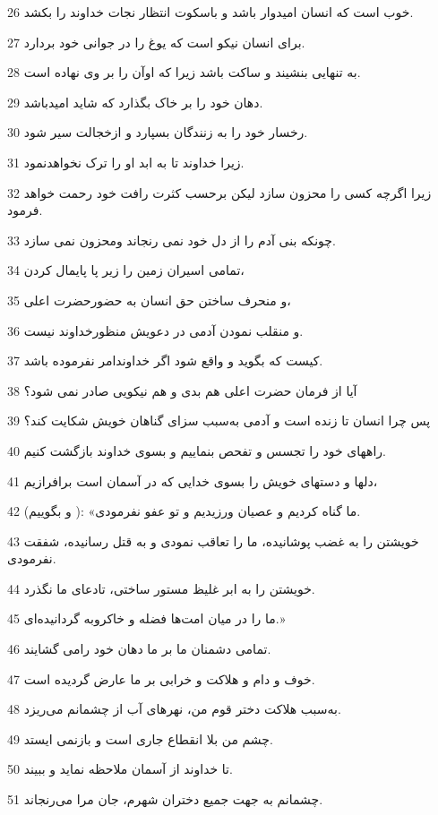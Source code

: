 \par 26 خوب است که انسان امیدوار باشد و باسکوت انتظار نجات خداوند را بکشد.
\par 27 برای انسان نیکو است که یوغ را در جوانی خود بردارد.
\par 28 به تنهایی بنشیند و ساکت باشد زیرا که اوآن را بر وی نهاده است.
\par 29 دهان خود را بر خاک بگذارد که شاید امیدباشد.
\par 30 رخسار خود را به زنندگان بسپارد و ازخجالت سیر شود.
\par 31 زیرا خداوند تا به ابد او را ترک نخواهدنمود.
\par 32 زیرا اگر‌چه کسی را محزون سازد لیکن برحسب کثرت رافت خود رحمت خواهد فرمود. 
\par 33 چونکه بنی آدم را از دل خود نمی رنجاند ومحزون نمی سازد.
\par 34 تمامی اسیران زمین را زیر پا پایمال کردن،
\par 35 و منحرف ساختن حق انسان به حضورحضرت اعلی،
\par 36 و منقلب نمودن آدمی در دعویش منظورخداوند نیست.
\par 37 کیست که بگوید و واقع شود اگر خداوندامر نفرموده باشد.
\par 38 آیا از فرمان حضرت اعلی هم بدی و هم نیکویی صادر نمی شود؟
\par 39 پس چرا انسان تا زنده است و آدمی به‌سبب سزای گناهان خویش شکایت کند؟
\par 40 راههای خود را تجسس و تفحص بنماییم و بسوی خداوند بازگشت کنیم.
\par 41 دلها و دستهای خویش را بسوی خدایی که در آسمان است برافرازیم،
\par 42 (و بگوییم ): «ما گناه کردیم و عصیان ورزیدیم و تو عفو نفرمودی.
\par 43 خویشتن را به غضب پوشانیده، ما را تعاقب نمودی و به قتل رسانیده، شفقت نفرمودی.
\par 44 خویشتن را به ابر غلیظ مستور ساختی، تادعای ما نگذرد.
\par 45 ما را در میان امت‌ها فضله و خاکروبه گردانیده‌ای.»
\par 46 تمامی دشمنان ما بر ما دهان خود رامی گشایند.
\par 47 خوف و دام و هلاکت و خرابی بر ما عارض گردیده است.
\par 48 به‌سبب هلاکت دختر قوم من، نهرهای آب از چشمانم می‌ریزد.
\par 49 چشم من بلا انقطاع جاری است و بازنمی ایستد.
\par 50 تا خداوند از آسمان ملاحظه نماید و ببیند.
\par 51 چشمانم به جهت جمیع دختران شهرم، جان مرا می‌رنجاند.
